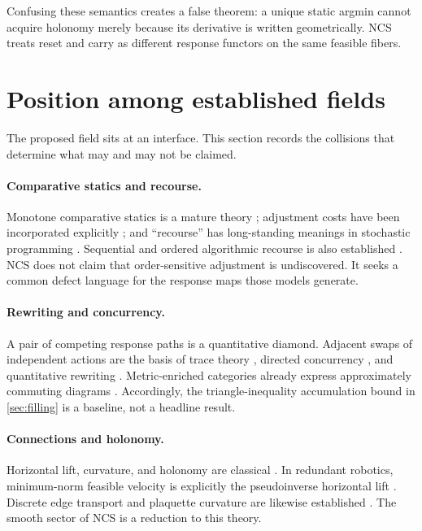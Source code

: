 \documentclass[11pt]{article}
\theoremstyle{definition}
\theoremstyle{remark}
\begin{document}
Confusing these semantics creates a false theorem: a unique static argmin
cannot acquire holonomy merely because its derivative is written
geometrically. NCS treats reset and carry as different response functors on
the same feasible fibers.

\section{Position among established fields}

The proposed field sits at an interface. This section records the collisions
that determine what may and may not be claimed.

\paragraph{Comparative statics and recourse.}
Monotone comparative statics is a mature theory
\citep{milgrom1994}; adjustment costs have been incorporated explicitly
\citep{dekel2025}; and ``recourse'' has long-standing meanings in stochastic
programming \citep{dantzig1955}. Sequential and ordered algorithmic recourse
is also established \citep{rasouli2024,verma2022}. NCS does not claim that
order-sensitive adjustment is undiscovered. It seeks a common defect language
for the response maps those models generate.

\paragraph{Rewriting and concurrency.}
A pair of competing response paths is a quantitative diamond. Adjacent swaps
of independent actions are the basis of trace theory
\citep{mazurkiewicz1988}, directed concurrency
\citep{kahl2016,earnshaw2026}, and quantitative rewriting
\citep{gavazzo2023}. Metric-enriched categories already express
approximately commuting diagrams \citep{kubis2013}. Accordingly, the
triangle-inequality accumulation bound in \cref{sec:filling} is a baseline,
not a headline result.

\paragraph{Connections and holonomy.}
Horizontal lift, curvature, and holonomy are classical
\citep{ehresmann1952,ambrose1953,oneill1966}. In redundant robotics,
minimum-norm feasible velocity is explicitly the pseudoinverse horizontal lift
\citep{altafini2004,shamir1988}. Discrete edge transport and plaquette
curvature are likewise established
\citep{leok2005,fernandez2022,wilson1974}. The smooth sector of NCS is a
reduction to this theory.
\end{document}
